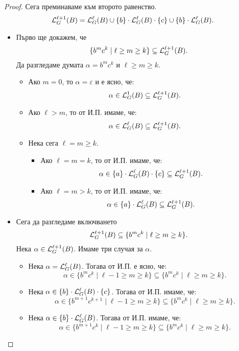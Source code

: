 \begin{proof}
  Сега преминаваме към второто равенство.
  \[\mathcal{L}^{\ell+1}_G(B) = \mathcal{L}^\ell_G(B) \cup \{b\} \cdot \mathcal{L}^\ell_G(B) \cdot \{c\} \cup \{b\} \cdot \mathcal{L}^\ell_G(B).\]  
  \begin{itemize}
  \item
    Първо ще докажем, че
    \[\{b^mc^k \mid \ell \geq m \geq k\} \subseteq \mathcal{L}^{\ell+1}_G(B).\]
    Да разгледаме думата $\alpha = b^mc^k$ и $\ell \geq m \geq k$.
    \begin{itemize}
    \item
      Ако $m = 0$, то $\alpha = \varepsilon$ и е ясно, че:
      \[\alpha \in \mathcal{L}^{1}_G(B) \subseteq \mathcal{L}^{\ell+1}_G(B).\]
    \item
      Ако $\ell > m$, то от И.П. имаме, че:
      \[\alpha \in \mathcal{L}^{\ell}_G(B) \subseteq \mathcal{L}^{\ell+1}_G(B).\]
    \item
      Нека сега $\ell = m \geq k$.
      \begin{itemize}
      \item
        Ако $\ell = m = k$, то от И.П. имаме, че:
        \[\alpha \in \{a\} \cdot \mathcal{L}^\ell_G(B) \cdot \{c\} \subseteq \mathcal{L}^{\ell+1}_G(B).\]
      \item
        Ако $\ell = m > k$, то от И.П. имаме, че:
        \[\alpha \in \{a\} \cdot \mathcal{L}^\ell_G(B) \subseteq \mathcal{L}^{\ell+1}_G(B).\]
      \end{itemize}
    \end{itemize}
  \item
    Сега да разгледаме включването
    \[\mathcal{L}^{\ell+1}_G(B) \subseteq \{b^mc^k \mid \ell \geq m \geq k\}.\]
    Нека $\alpha \in \mathcal{L}^{\ell+1}_G(B)$. Имаме три случая за $\alpha$.
    \begin{itemize}
    \item
      Нека $\alpha = \mathcal{L}^\ell_G(B)$. Тогава от И.П. е ясно, че:
      \[\alpha \in \{b^mc^k \mid \ell-1 \geq m \geq k\} \subseteq \{b^mc^k \mid \ell \geq m \geq k\}.\]
    \item
      Нека $\alpha \in \{b\} \cdot \mathcal{L}^\ell_G(B) \cdot \{c\}$. Тогава от И.П. имаме, че:
      \[\alpha \in \{b^{m+1}c^{k+1} \mid \ell-1\geq m \geq k\} \subseteq \{b^mc^k \mid \ell \geq m \geq k\}.\]
    \item
      Нека $\alpha \in \{b\} \cdot \mathcal{L}^\ell_G(B)$. Тогава от И.П. имаме, че:
      \[\alpha \in \{b^{m+1}c^{k} \mid \ell-1\geq m \geq k\} \subseteq \{b^mc^k \mid \ell \geq m \geq k\}.\] 
    \end{itemize}
  \end{itemize}
  
  
  

\end{proof}
